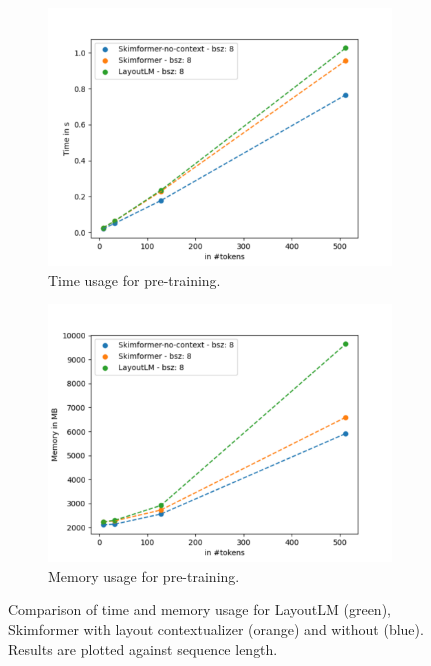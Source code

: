 \begin{figure}[!htbp]
\centering
\small
  \begin{subfigure}[b]{0.49\textwidth}
    \includegraphics[width=\textwidth]{images/chapter3/train_time_plot.pdf}
    \caption{Time usage for pre-training.}
    \label{fig:chapter3-benchmark-train-time}
  \end{subfigure}
  \begin{subfigure}[b]{0.49\textwidth}
    \includegraphics[width=\textwidth]{images/chapter3/train_required_memory_plot.pdf}
    \caption{Memory usage for pre-training.}
    \label{fig:chapter3-benchmark-train-memory}
  \end{subfigure}
  \caption{Comparison of time and memory usage for LayoutLM (green), Skimformer with layout contextualizer (orange) and without (blue). Results are plotted against sequence length.}
  \label{fig:chapter3-benchmark}
\end{figure}

